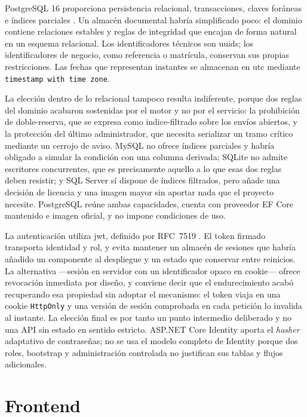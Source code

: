 PostgreSQL 16 proporciona persistencia relacional, transacciones, claves foráneas e índices parciales \cite{postgresql}. Un almacén documental habría simplificado poco: el dominio contiene relaciones estables y reglas de integridad que encajan de forma natural en un esquema relacional. Los identificadores técnicos son \glspl{uuid}; los identificadores de negocio, como referencia o matrícula, conservan sus propias restricciones. Las fechas que representan instantes se almacenan en \gls{utc} mediante \texttt{timestamp with time zone}.

La elección dentro de lo relacional tampoco resulta indiferente, porque dos reglas del dominio acabaron sostenidas por el motor y no por el servicio: la prohibición de \gls{doble-reserva}, que se expresa como \gls{indice-filtrado} sobre los envíos abiertos, y la protección del último administrador, que necesita serializar un tramo crítico mediante un cerrojo de aviso. MySQL no ofrece índices parciales y habría obligado a simular la condición con una columna derivada; SQLite no admite escritores concurrentes, que es precisamente aquello a lo que esas dos reglas deben resistir; y SQL Server sí dispone de índices filtrados, pero añade una decisión de licencia y una imagen mayor sin aportar nada que el proyecto necesite. PostgreSQL reúne ambas capacidades, cuenta con proveedor EF Core mantenido e imagen oficial, y no impone condiciones de uso.

La autenticación utiliza \gls{jwt}, definido por RFC~7519 \cite{rfc7519}. El token firmado transporta identidad y rol, y evita mantener un almacén de sesiones que habría añadido un componente al despliegue y un estado que conservar entre reinicios. La alternativa ---sesión en servidor con un identificador opaco en cookie--- ofrece revocación inmediata por diseño, y conviene decir que el endurecimiento acabó recuperando esa propiedad sin adoptar el mecanismo: el token viaja en una cookie \texttt{HttpOnly} y una versión de sesión comprobada en cada petición lo invalida al instante. La elección final es por tanto un punto intermedio deliberado y no una API sin estado en sentido estricto. ASP.NET Core Identity aporta el \emph{hasher} adaptativo de contraseñas; no se usa el modelo completo de Identity porque dos roles, bootstrap y administración controlada no justifican sus tablas y flujos adicionales.

\section{Frontend}

